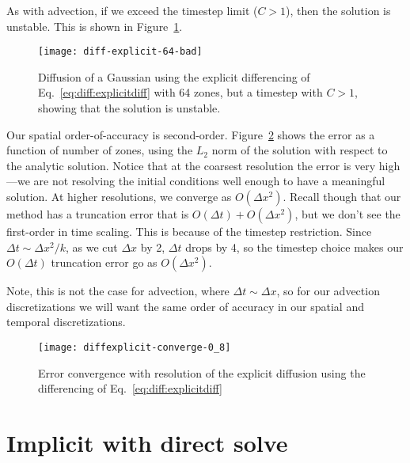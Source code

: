 As with advection, if we exceed the timestep limit ($C > 1$), then
the solution is unstable.  This is shown in Figure~\ref{fig:diff_explicit_bad}.

\begin{figure}
\centering
\texttt{[image: diff-explicit-64-bad]}
\caption[Unstable explicit diffusion]{\label{fig:diff_explicit_bad}
Diffusion of a Gaussian using the explicit differencing of
Eq.~\ref{eq:diff:explicitdiff} with 64 zones, but a timestep
with $C > 1$, showing that the solution is unstable.
 \\ }
\end{figure}

Our spatial order-of-accuracy is second-order.
Figure~\ref{fig:diffexplicit_converge} shows the error as a function
of number of zones, using the $L_2$ norm of the solution with respect
to the analytic solution.  Notice that at the coarsest resolution the
error is very high---we are not resolving the initial conditions well
enough to have a meaningful solution.  At higher resolutions, we
converge as $O(\Delta x^2)$.  Recall though that our method has a
truncation error that is $O(\Delta t) + O(\Delta x^2)$, but we don't
see the first-order in time scaling.  This is because of the timestep
restriction.  Since $\Delta t \sim \Delta x^2/k$, as we cut $\Delta x$
by 2, $\Delta t$ drops by 4, so the timestep choice makes our
$O(\Delta t)$ truncation error go as $O(\Delta x^2)$.

Note, this is not the case for advection, where $\Delta t \sim \Delta x$, so
for our advection discretizations we will want the same order of accuracy
in our spatial and temporal discretizations.

\begin{figure}
\centering
\texttt{[image: diffexplicit-converge-0\_8]}
\caption[Error convergence of explicit diffusion]{\label{fig:diffexplicit_converge}
Error convergence with resolution of the explicit diffusion using the differencing of 
Eq.~\ref{eq:diff:explicitdiff}
 \\ }
\end{figure}

\section{Implicit with direct solve}

